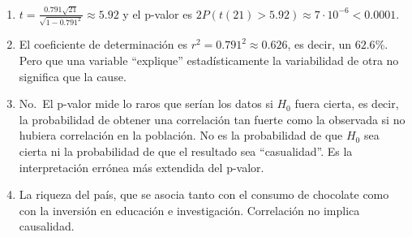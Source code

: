 \documentclass[
  spanish,
  a4paper,
]{scrreport}
\theoremstyle{definition}
\theoremstyle{remark}
\begin{document}
\begin{tcolorbox}[enhanced jigsaw, arc=.35mm, bottomrule=.15mm, bottomtitle=1mm, breakable, colback=white, colbacktitle=quarto-callout-tip-color!10!white, colframe=quarto-callout-tip-color-frame, coltitle=black, left=2mm, leftrule=.75mm, opacityback=0, opacitybacktitle=0.6, rightrule=.15mm, title=\textcolor{quarto-callout-tip-color}{\faLightbulb}\hspace{0.5em}{Solución}, titlerule=0mm, toprule=.15mm, toptitle=1mm]

\begin{enumerate}
\def\labelenumi{\alph{enumi}.}
\item
  \(t=\frac{0.791\sqrt{21}}{\sqrt{1-0.791^2}}\approx 5.92\) y el p-valor
  es \(2P(t(21)>5.92)\approx 7\cdot 10^{-6}<0.0001\).
\item
  El coeficiente de determinación es \(r^2=0.791^2\approx 0.626\), es
  decir, un \(62.6\)\%. Pero que una variable ``explique''
  estadísticamente la variabilidad de otra no significa que la cause.
\item
  No.~El p-valor mide lo raros que serían los datos si \(H_0\) fuera
  cierta, es decir, la probabilidad de obtener una correlación tan
  fuerte como la observada si no hubiera correlación en la población. No
  es la probabilidad de que \(H_0\) sea cierta ni la probabilidad de que
  el resultado sea ``casualidad''. Es la interpretación errónea más
  extendida del p-valor.
\item
  La riqueza del país, que se asocia tanto con el consumo de chocolate
  como con la inversión en educación e investigación. Correlación no
  implica causalidad.
\end{enumerate}

\end{tcolorbox}
\end{document}
